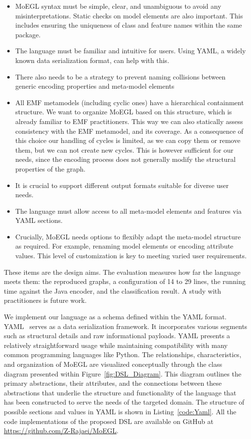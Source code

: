 \documentclass[journal,article,submit,moreauthors,technologies]{Definitions/mdpi}
\newcommand{\rev}[1]{#1}
\begin{document}
\begin{itemize}
    \item MoEGL syntax must be simple, clear, and unambiguous to avoid any misinterpretations. Static checks on model elements are also important. This includes ensuring the uniqueness of class and feature names within the same package.
    \item The language must be familiar and intuitive for users. Using YAML, a widely known data serialization format, can help with this.
    \item There also needs to be a strategy to prevent naming collisions between generic encoding properties and meta-model elements
    \item All EMF metamodels (including cyclic ones) have a hierarchical containment structure. We want to organize MoEGL based on this structure, which is already familiar to EMF practitioners. This way we can also statically assess consistency with the EMF metamodel, and its coverage. As a consequence of this choice our handling of cycles is limited, as we can copy them or remove them, but we can not create new cycles. This is however sufficient for our needs, since the encoding process does not generally modify the structural properties of the graph.
    \item It is crucial to support different output formats suitable for diverse user needs.
    \item The language must allow access to all meta-model elements and features via YAML sections.
    \item Crucially, MoEGL needs options to flexibly adapt the meta-model structure as required. For example, renaming model elements or encoding attribute values. This level of customization is key to meeting varied user requirements.
\end{itemize}
\rev{These items are the design aims. The evaluation measures how far the language meets them: the reproduced graphs, a configuration of 14 to 29 lines, the running time against the Java encoder, and the classification result. A study with practitioners is future work.}

We implement our language as a schema defined within the YAML format. YAML~\cite{ben2009yaml} serves as a data serialization framework. It incorporates various segments such as structural details and raw informational payloads. YAML presents a relatively straightforward usage while maintaining compatibility with many common programming languages like Python. The relationships, characteristics, and organization of MoEGL are visualized conceptually through the class diagram presented within Figure~\ref{fig:DSL_Diagram}. This diagram outlines the primary abstractions, their attributes, and the connections between these abstractions that underlie the structure and functionality of the language that has been constructed to serve the needs of the targeted domain. The structure of possible sections and values in YAML is shown in Listing~\ref{code:Yaml}. All the code implementations of the proposed DSL are available on GitHub at \url{https://github.com/Z-Rajaei/MoEGL}.
\end{document}
